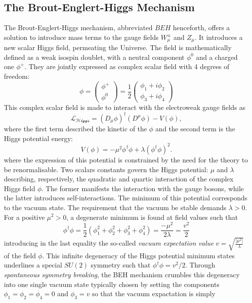 \subsection{The Brout-Englert-Higgs Mechanism}
The Brout-Englert-Higgs mechanism, abbreviated $BEH$ henceforth, offers a solution to introduce mass terms to the gauge fields $W_{\mu}^{\pm}$ and $Z_{\mu}$. It introduces a new scalar Higgs field, permeating the Universe. The field is mathematically defined as a weak isospin doublet, with a neutral component $\phi^0$ and a charged one $\phi^+$. They are jointly expressed as complex scalar field with 4 degrees of freedom:
\begin{equation}
\phi = \begin{pmatrix}
    \phi^+\\ 
    \phi^0
\end{pmatrix} = \frac{1}{2} \begin{pmatrix}
    \phi_1 + i\phi_2 \\ 
    \phi_3 + i\phi_4
\end{pmatrix}
\end{equation}
This complex scalar field is made to interact with the electroweak gauge fields as 
\begin{equation}\label{eq-HiggsLag}
    \mathcal{L_{\text{Higgs}}} = (D_{\mu}\phi)^{\dagger} (D^{\mu}\phi) - V(\phi),
 \end{equation}
where the first term described the kinetic of the $\phi$ and the second term is the Higgs potential energy:
\begin{equation}\label{eq-HiggsLag}
 V(\phi) = - \mu^2  \phi^{\dagger} \phi + \lambda (\phi^{\dagger} \phi)^2.
\end{equation}
where the expression of this potential is constrained by the need for the theory to be renormalisable. Two scalars constants govern the Higgs potential: $\mu$ and $\lambda$ describing, respectively, the quadratic and quartic interaction of the complex Higgs field $\phi$. The former manifests the interaction with the gauge bosons, while the latter introduces self-interactions. The minimum of this potential corresponds to the vacuum state. The requirement that the vacuum be stable demands $\lambda > 0$. For a positive $\mu^2 > 0$, a degenerate minimum is found at field values such that
\begin{equation}\label{eq-HiggsLag}
    \phi^{\dagger} \phi  = \frac{1}{2} (\phi_1^2 + \phi_2^2 + \phi_3^2 + \phi_4^2) = \frac{- \mu^2}{2\lambda} = \frac{v^2}{2}
\end{equation}
introducing in the last equality the so-called \textit{vacuum expectation value} $v = \sqrt{\frac{|\mu^2|}{\lambda}}$ of the field $\phi$. This infinite degeneracy of the Higgs potential minimum states underlines a special $SU(2)$ symmetry such that $\phi^{\dagger} \phi = v^2/2$. Through \textit{spontaneous symmetry breaking}, the BEH mechanism crumbles this degeneracy into one single vacuum state typically chosen by setting the components $\phi_1 = \phi_2 = \phi_4 = 0$ and $\phi_3 = v$ so that the vacuum expactation is simply
